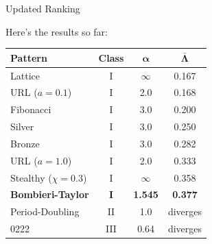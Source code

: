 \documentclass[aspectratio=169, 11pt]{beamer}
\begin{document}
\begin{frame}{Updated Ranking}

Here's the results so far:

\vspace{0.3em}
\small
\centering
\begin{tabular}{lccc}
\toprule
\textbf{Pattern} & \textbf{Class} & $\boldsymbol{\alpha}$ & $\boldsymbol{\bar{\Lambda}}$ \\
\midrule
Lattice               & I & $\infty$ & 0.167 \\
URL ($a=0.1$)         & I & 2.0      & 0.168 \\
Fibonacci             & I & 3.0      & 0.200 \\
Silver                & I & 3.0      & 0.250 \\
Bronze                & I & 3.0      & 0.282 \\
URL ($a=1.0$)         & I & 2.0      & 0.333 \\
Stealthy ($\chi=0.3$) & I & $\infty$ & 0.358 \\
\rowcolor{resultbg}
\textbf{Bombieri-Taylor} & \textbf{I} & \textbf{1.545} & \textbf{0.377} \\
\midrule
Period-Doubling       & II  & 1.0  & diverges \\
0222                  & III & 0.64 & diverges \\
\bottomrule
\end{tabular}
\end{frame}
\end{document}
